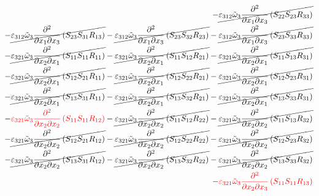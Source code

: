 \begin{equation}
\begin{split}
		-\cancel{\varepsilon_{312}\tilde{\omega}_{3}\pdv{}{x_{1}}{x_{3}}\left(S_{22}S_{23}R_{33}\right)}\\
		-\cancel{\varepsilon_{312}\tilde{\omega}_{3}\pdv{}{x_{1}}{x_{3}}\left(S_{23}S_{31}R_{13}\right)}
		-\cancel{\varepsilon_{312}\tilde{\omega}_{3}\pdv{}{x_{1}}{x_{3}}\left(S_{23}S_{32}R_{23}\right)}
		-\cancel{\varepsilon_{312}\tilde{\omega}_{3}\pdv{}{x_{1}}{x_{3}}\left(S_{23}S_{33}R_{33}\right)}\\
		-\cancel{\varepsilon_{321}\tilde{\omega}_{3}\pdv{}{x_{2}}{x_{1}}\left(S_{11}S_{11}R_{11}\right)}
		-\cancel{\varepsilon_{321}\tilde{\omega}_{3}\pdv{}{x_{2}}{x_{1}}\left(S_{11}S_{12}R_{21}\right)}
		-\cancel{\varepsilon_{321}\tilde{\omega}_{3}\pdv{}{x_{2}}{x_{1}}\left(S_{11}S_{13}R_{31}\right)}\\
		-\cancel{\varepsilon_{321}\tilde{\omega}_{3}\pdv{}{x_{2}}{x_{1}}\left(S_{12}S_{21}R_{11}\right)}
		-\cancel{\varepsilon_{321}\tilde{\omega}_{3}\pdv{}{x_{2}}{x_{1}}\left(S_{12}S_{22}R_{21}\right)}
		-\cancel{\varepsilon_{321}\tilde{\omega}_{3}\pdv{}{x_{2}}{x_{1}}\left(S_{12}S_{23}R_{31}\right)}\\
		-\cancel{\varepsilon_{321}\tilde{\omega}_{3}\pdv{}{x_{2}}{x_{1}}\left(S_{13}S_{31}R_{11}\right)}
		-\cancel{\varepsilon_{321}\tilde{\omega}_{3}\pdv{}{x_{2}}{x_{1}}\left(S_{13}S_{32}R_{21}\right)}
		-\cancel{\varepsilon_{321}\tilde{\omega}_{3}\pdv{}{x_{2}}{x_{1}}\left(S_{13}S_{33}R_{31}\right)}\\
		-{\color{red}\varepsilon_{321}\tilde{\omega}_{3}\pdv{}{x_{2}}{x_{2}}\left(S_{11}S_{11}R_{12}\right)}
		-\cancel{\varepsilon_{321}\tilde{\omega}_{3}\pdv{}{x_{2}}{x_{2}}\left(S_{11}S_{12}R_{22}\right)}
		-\cancel{\varepsilon_{321}\tilde{\omega}_{3}\pdv{}{x_{2}}{x_{2}}\left(S_{11}S_{13}R_{32}\right)}\\
		-\cancel{\varepsilon_{321}\tilde{\omega}_{3}\pdv{}{x_{2}}{x_{2}}\left(S_{12}S_{21}R_{12}\right)}
		-\cancel{\varepsilon_{321}\tilde{\omega}_{3}\pdv{}{x_{2}}{x_{2}}\left(S_{12}S_{22}R_{22}\right)}
		-\cancel{\varepsilon_{321}\tilde{\omega}_{3}\pdv{}{x_{2}}{x_{2}}\left(S_{12}S_{23}R_{32}\right)}\\
		-\cancel{\varepsilon_{321}\tilde{\omega}_{3}\pdv{}{x_{2}}{x_{2}}\left(S_{13}S_{31}R_{12}\right)}
		-\cancel{\varepsilon_{321}\tilde{\omega}_{3}\pdv{}{x_{2}}{x_{2}}\left(S_{13}S_{32}R_{22}\right)}
		-\cancel{\varepsilon_{321}\tilde{\omega}_{3}\pdv{}{x_{2}}{x_{2}}\left(S_{13}S_{33}R_{32}\right)}\\
		-{\color{red}\varepsilon_{321}\tilde{\omega}_{3}\pdv{}{x_{2}}{x_{3}}\left(S_{11}S_{11}R_{13}\right)}

\end{split}
\end{equation}
